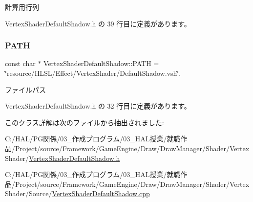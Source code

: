 計算用行列 



 Vertex\+Shader\+Default\+Shadow.\+h の 39 行目に定義があります。

\mbox{\label{class_vertex_shader_default_shadow_ad456e5159f0ce67d6ad53f39732bccb1}} 
\subsubsection{\texorpdfstring{P\+A\+TH}{PATH}}
{\footnotesize\ttfamily const char $\ast$ Vertex\+Shader\+Default\+Shadow\+::\+P\+A\+TH = \char`\"{}resource/H\+L\+SL/Effect/Vertex\+Shader/Default\+Shadow.\+vsh\char`\"{}\hspace{0.3cm}{\ttfamily [static]}, {\ttfamily [private]}}



ファイルパス 



 Vertex\+Shader\+Default\+Shadow.\+h の 32 行目に定義があります。



このクラス詳解は次のファイルから抽出されました\+:\begin{DoxyCompactItemize}
\item 
C\+:/\+H\+A\+L/\+P\+G関係/03\+\_\+作成プログラム/03\+\_\+\+H\+A\+L授業/就職作品/\+Project/source/\+Framework/\+Game\+Engine/\+Draw/\+Draw\+Manager/\+Shader/\+Vertex\+Shader/\mbox{\hyperlink{_vertex_shader_default_shadow_8h}{Vertex\+Shader\+Default\+Shadow.\+h}}\item 
C\+:/\+H\+A\+L/\+P\+G関係/03\+\_\+作成プログラム/03\+\_\+\+H\+A\+L授業/就職作品/\+Project/source/\+Framework/\+Game\+Engine/\+Draw/\+Draw\+Manager/\+Shader/\+Vertex\+Shader/\+Source/\mbox{\hyperlink{_vertex_shader_default_shadow_8cpp}{Vertex\+Shader\+Default\+Shadow.\+cpp}}\end{DoxyCompactItemize}
